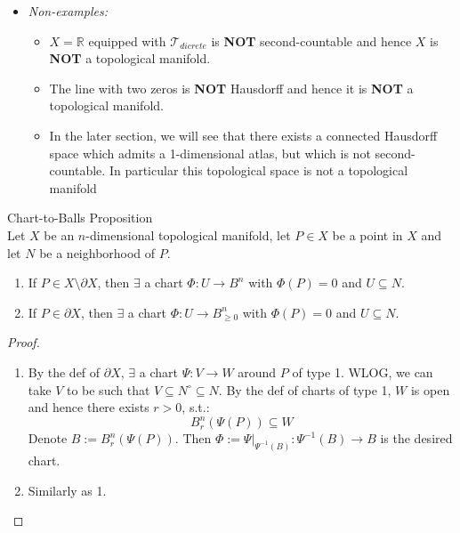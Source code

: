 \begin{itemize}
\begin{itemize}
        \item The empty set $\emptyset$ is a topological manifold of any dimension.
    \end{itemize}

    \item \textit{Non-examples:}
    \begin{itemize}
        \item $X=\mathbb{R}$ equipped with $\mathcal{T}_{dicrete}$ is \textbf{NOT} second-countable and hence $X$ is \textbf{NOT} a topological manifold.

        \item The line with two zeros is \textbf{NOT} Hausdorff and hence it is \textbf{NOT} a topological manifold.

        \item In the later section, we will see that there exists a connected Hausdorff space which admits a 1-dimensional atlas, but which is not second-countable. In particular this topological space is not a topological manifold
    \end{itemize}
\end{itemize}

\begin{proposition}{Chart-to-Balls Proposition}\\
Let $X$ be an $n$-dimensional topological manifold, let $P \in X$ be a point in $X$ and let $N$ be a neighborhood of $P$.
\begin{enumerate}
    \item If $P \in X \setminus\partial X$, then $\exists$ a chart $\Phi: U \to B^n$ with $\Phi(P) =0$ and $U \subseteq N$.
    \item If $P \in \partial X$, then $\exists$ a chart $\Phi: U \to B^n_{\geq 0}$ with $\Phi(P) =0$ and $U \subseteq N$.
\end{enumerate}
\end{proposition}

\begin{proof}
    \begin{enumerate}
        \item By the def of $\partial X$, $\exists$ a chart $\Psi:V \to W$ around $P$ of type 1. WLOG, we can take $V$ to be such that $V \subseteq N^\circ \subseteq N$. By the def of charts of type 1, $W$ is open and hence there exists $r>0$, s.t.:
        $$B_r^n (\Psi (P)) \subseteq W$$
        Denote $B:= B_r^n (\Psi (P))$. Then $\Phi := \Psi|_{\Psi^{-1}(B)} : \Psi^{-1}(B)\to B$ is the desired chart.

        \item Similarly as 1.
    \end{enumerate}
\end{proof}

